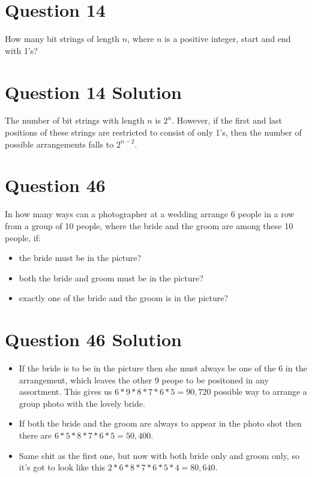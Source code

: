 \documentclass[11pt]{article}
\begin{document}
\section*{Question 14}

How many bit strings of length $n$, where $n$ is a positive integer, start and end with 1's?

\section*{Question 14 Solution}

The number of bit strings with length $n$ is $2^n$. However, if the first and last positions of these strings are restricted to consist of only 1's, then the number of possible arrangements falls to $2^{n-2}$.

\section*{Question 46}

In how many ways can a photographer at a wedding arrange 6 people in a row from a group of 10 people, where the bride and the groom are among these 10 people, if:

\begin{itemize}
\item the bride must be in the picture?
\item both the bride and groom must be in the picture?
\item exactly one of the bride and the groom is in the picture?
\end{itemize}

\section*{Question 46 Solution}

\begin{itemize}
\item If the bride is to be in the picture then she must always be one of the 6 in the arrangement, which leaves the other 9 peope to be positoned in any assortment. This gives us $6*9*8*7*6*5=90,720$ possible way to arrange a group photo with the lovely bride.
\item If both the bride and the groom are always to appear in the photo shot then there are $6*5*8*7*6*5=50,400$.
\item Same shit as the first one, but now with both bride only and groom only, so it's got to look like this $2*6*8*7*6*5*4=80,640$.
\end{itemize}
\end{document}
